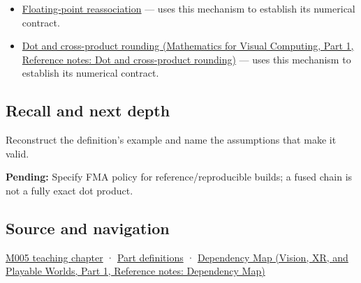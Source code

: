 \hypertarget{appendix-41e8ef22a21e-used-by}{}

\begin{itemize}
\tightlist
\item
  \hyperref[appendix-c2ac4a84c283]{Floating-point reassociation} --- uses this mechanism to establish its numerical contract.
\item
  \href{../02-Mathematics-for-Visual-Computing-P01/main.pdf\#nameddest=appendix-5aef4f13483a}{Dot and cross-product rounding (Mathematics for Visual Computing, Part 1, Reference notes: Dot and cross-product rounding)} --- uses this mechanism to establish its numerical contract.
\end{itemize}

\subsection{Recall and next depth}\label{appendix-41e8ef22a21e-recall-and-next-depth}

\hypertarget{appendix-41e8ef22a21e-recall-and-next-depth}{}

Reconstruct the definition's example and name the assumptions that make it valid.

\textbf{Pending:} Specify FMA policy for reference/reproducible builds; a fused chain is not a fully exact dot product.

\subsection{Source and navigation}\label{appendix-41e8ef22a21e-source-and-navigation}

\hypertarget{appendix-41e8ef22a21e-source-and-navigation}{}

\hyperref[01-foundations-i-ch001-when-arithmetic-meets-uncertainty]{M005 teaching chapter} · \hyperref[appendix-fd090d982a15-m005---parts-77-88]{Part definitions} · \href{../07-Vision-XR-and-Playable-Worlds-P01/main.pdf\#nameddest=appendix-4ad47bdd269a}{Dependency Map (Vision, XR, and Playable Worlds, Part 1, Reference notes: Dependency Map)}
